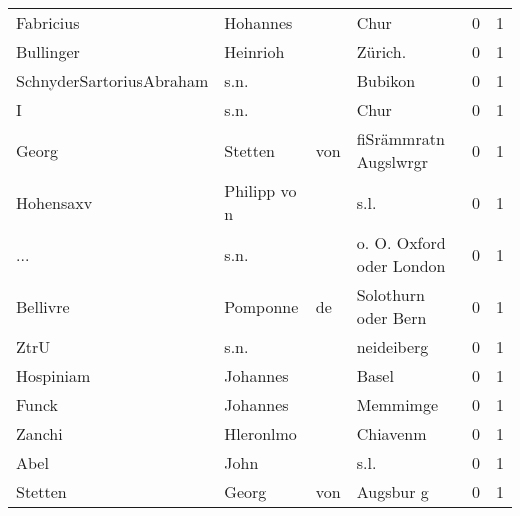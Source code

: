 \begin{tabular}{llllrr}
                Fabricius &                           Hohannes &             &                                        Chur &          0 &         1 \\
                Bullinger &                           Heinrioh &             &                                    Zürich.  &          0 &         1 \\
 SchnyderSartoriusAbraham &                               s.n. &             &                                     Bubikon &          0 &         1 \\
                        I &                               s.n. &             &                                        Chur &          0 &         1 \\
                    Georg &                            Stetten &         von &                       fiSrämmratn Augslwrgr &          0 &         1 \\
                Hohensaxv &                       Philipp vo n &             &                                        s.l. &          0 &         1 \\
                      ... &                               s.n. &             &                    o. O. Oxford oder London &          0 &         1 \\
                 Bellivre &                           Pomponne &          de &                         Solothurn oder Bern &          0 &         1 \\
                     ZtrU &                               s.n. &             &                                  neideiberg &          0 &         1 \\
                Hospiniam &                           Johannes &             &                                       Basel &          0 &         1 \\
                    Funck &                           Johannes &             &                                    Memmimge &          0 &         1 \\
                   Zanchi &                          Hleronlmo &             &                                    Chiavenm &          0 &         1 \\
                     Abel &                               John &             &                                        s.l. &          0 &         1 \\
                  Stetten &                              Georg &         von &                                   Augsbur g &          0 &         1 \\

\end{tabular}
